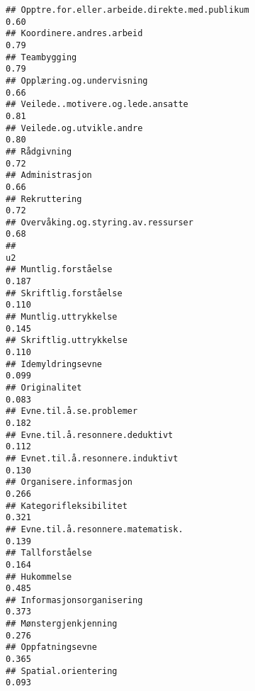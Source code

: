 \documentclass[
]{article}
\begin{document}
\begin{verbatim}
## Opptre.for.eller.arbeide.direkte.med.publikum                                    0.60
## Koordinere.andres.arbeid                                                         0.79
## Teambygging                                                                      0.79
## Opplæring.og.undervisning                                                        0.66
## Veilede..motivere.og.lede.ansatte                                                0.81
## Veilede.og.utvikle.andre                                                         0.80
## Rådgivning                                                                       0.72
## Administrasjon                                                                   0.66
## Rekruttering                                                                     0.72
## Overvåking.og.styring.av.ressurser                                               0.68
##                                                                                     u2
## Muntlig.forståelse                                                               0.187
## Skriftlig.forståelse                                                             0.110
## Muntlig.uttrykkelse                                                              0.145
## Skriftlig.uttrykkelse                                                            0.110
## Idemyldringsevne                                                                 0.099
## Originalitet                                                                     0.083
## Evne.til.å.se.problemer                                                          0.182
## Evne.til.å.resonnere.deduktivt                                                   0.112
## Evnet.til.å.resonnere.induktivt                                                  0.130
## Organisere.informasjon                                                           0.266
## Kategorifleksibilitet                                                            0.321
## Evne.til.å.resonnere.matematisk.                                                 0.139
## Tallforståelse                                                                   0.164
## Hukommelse                                                                       0.485
## Informasjonsorganisering                                                         0.373
## Mønstergjenkjenning                                                              0.276
## Oppfatningsevne                                                                  0.365
## Spatial.orientering                                                              0.093

\end{verbatim}
\end{document}
